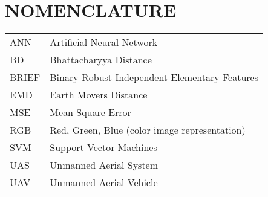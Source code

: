%
%
%
%


\chapter*{NOMENCLATURE}

\vspace{-0.5in}
	\begin{table}[htbp]
	    \begin{tabular}{@{}p{} p{}@{}}
		ANN	&	Artificial Neural Network\\	[2ex]
		BD	&	Bhattacharyya Distance\\	[2ex]
		BRIEF & Binary Robust Independent Elementary Features\\ [2ex]
		EMD	&	Earth Movers Distance\\	[2ex]
		MSE	&	Mean Square Error\\	[2ex]
		RGB &	Red, Green, Blue (color image representation)\\ [2ex]
		SVM &	Support Vector Machines\\ [2ex]
		UAS	&	Unmanned Aerial System\\	[2ex]
		UAV	&	Unmanned Aerial Vehicle\\	[2ex]
	    \end{tabular}%
	\end{table}

\pagebreak{}